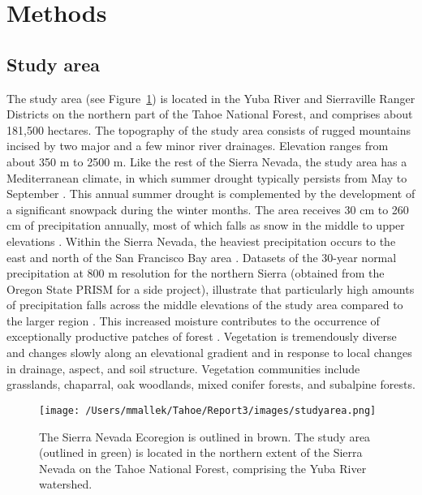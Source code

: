 \section{Methods}

\subsection*{Study area}
The study area (see Figure~\ref{projectarea-ch3}) is located in the Yuba River and Sierraville Ranger Districts on the northern part of the Tahoe National Forest, and comprises about 181,500 hectares. The topography of the study area consists of rugged mountains incised by two major and a few minor river drainages. Elevation ranges from about 350 m to 2500 m. Like the rest of the Sierra Nevada, the study area has a Mediterranean climate, in which summer drought typically persists from May to September \citep{Minnich2007,Skinner1996}. This annual summer drought is complemented by the development of a significant snowpack during the winter months. The area receives 30 cm to 260 cm of precipitation annually, most of which falls as snow in the middle to upper elevations \citep{Storer1963}. Within the Sierra Nevada, the heaviest precipitation occurs to the east and north of the San Francisco Bay area \citep{VanWag2006}. Datasets of the 30-year normal precipitation at 800 m resolution for the northern Sierra (obtained from the Oregon State PRISM for a side project), illustrate that particularly high amounts of precipitation falls across the middle elevations of the study area compared to the larger region \citep{PRISMClimateGroup2004}. This increased moisture contributes to the occurrence of exceptionally productive patches of forest \citep{Littell2012}. Vegetation is tremendously diverse and changes slowly along an elevational gradient and in response to local changes in drainage, aspect, and soil structure. Vegetation communities include grasslands, chaparral, oak woodlands, mixed conifer forests, and subalpine forests.

\begin{figure}
\centering
\texttt{[image: /Users/mmallek/Tahoe/Report3/images/studyarea.png]}
\caption{The Sierra Nevada Ecoregion is outlined in brown. The study area (outlined in green) is located in the northern extent of the Sierra Nevada on the Tahoe National Forest, comprising the Yuba River watershed.}
\label{projectarea-ch3}
\end{figure}

